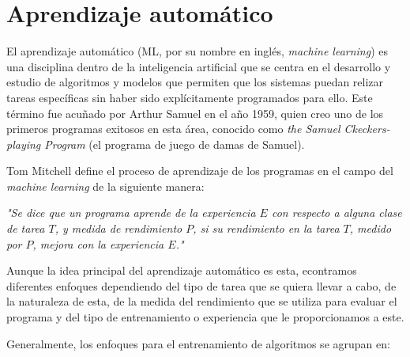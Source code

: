 \documentclass[11pt,spanish,listoffigures,listoftables]{tfgetsinf}
\begin{document}
\section{Aprendizaje automático}

El aprendizaje automático (ML, por su nombre en inglés, \textit{machine learning}) es una disciplina dentro de la inteligencia artificial que se centra en el desarrollo y estudio de algoritmos y modelos que permiten que los sistemas puedan relizar tareas específicas sin haber sido explícitamente programados para ello. Este término fue acuñado por Arthur Samuel en el año 1959, quien creo uno de los primeros programas exitosos en esta área, conocido como \textit{the Samuel Ckeckers-playing Program} \cite{samuelCheckers} (el programa de juego de damas de Samuel).

Tom Mitchell \cite{mitchell1997mcgraw} define el proceso de aprendizaje de los programas en el campo del \textit{machine learning} de la siguiente manera:

\begin{displayquote}
\textit{"Se dice que un programa aprende de la experiencia $E$ con respecto a alguna clase de tarea $T$, y medida de rendimiento $P$, si su rendimiento en la tarea $T$, medido por $P$, mejora con la experiencia $E$."}
\end{displayquote}

Aunque la idea principal del aprendizaje automático es esta, econtramos diferentes enfoques dependiendo del tipo de tarea que se quiera llevar a cabo, de la naturaleza de esta, de la medida del rendimiento que se utiliza para evaluar el programa y del tipo de entrenamiento o experiencia que le proporcionamos a este.

Generalmente, los enfoques para el entrenamiento de algoritmos se agrupan en:
\end{document}

